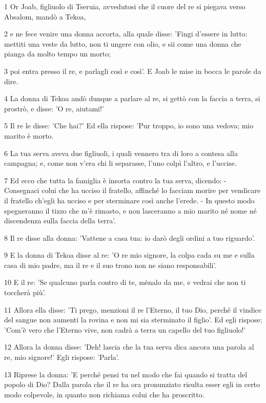 \par 1 Or Joab, figliuolo di Tseruia, avvedutosi che il cuore del re si piegava verso Absalom, mandò a Tekoa,
\par 2 e ne fece venire una donna accorta, alla quale disse: 'Fingi d'essere in lutto: mettiti una veste da lutto, non ti ungere con olio, e sii come una donna che pianga da molto tempo un morto;
\par 3 poi entra presso il re, e parlagli così e così'. E Joab le mise in bocca le parole da dire.
\par 4 La donna di Tekoa andò dunque a parlare al re, si gettò con la faccia a terra, si prostrò, e disse: 'O re, aiutami!'
\par 5 Il re le disse: 'Che hai?' Ed ella rispose: 'Pur troppo, io sono una vedova; mio marito è morto.
\par 6 La tua serva aveva due figliuoli, i quali vennero tra di loro a contesa alla campagna; e, come non v'era chi li separasse, l'uno colpì l'altro, e l'uccise.
\par 7 Ed ecco che tutta la famiglia è insorta contro la tua serva, dicendo: - Consegnaci colui che ha ucciso il fratello, affinché lo facciam morire per vendicare il fratello ch'egli ha ucciso e per sterminare così anche l'erede. - In questo modo spegneranno il tizzo che m'è rimasto, e non lasceranno a mio marito né nome né discendenza sulla faccia della terra'.
\par 8 Il re disse alla donna: 'Vattene a casa tua: io darò degli ordini a tuo riguardo'.
\par 9 E la donna di Tekoa disse al re: 'O re mio signore, la colpa cada su me e sulla casa di mio padre, ma il re e il suo trono non ne siano responsabili'.
\par 10 E il re: 'Se qualcuno parla contro di te, mènalo da me, e vedrai che non ti toccherà più'.
\par 11 Allora ella disse: 'Ti prego, menzioni il re l'Eterno, il tuo Dio, perché il vindice del sangue non aumenti la rovina e non mi sia sterminato il figlio'. Ed egli rispose: 'Com'è vero che l'Eterno vive, non cadrà a terra un capello del tuo figliuolo!'
\par 12 Allora la donna disse: 'Deh! lascia che la tua serva dica ancora una parola al re, mio signore!' Egli rispose: 'Parla'.
\par 13 Riprese la donna: 'E perché pensi tu nel modo che fai quando si tratta del popolo di Dio? Dalla parola che il re ha ora pronunziato risulta esser egli in certo modo colpevole, in quanto non richiama colui che ha proscritto.
